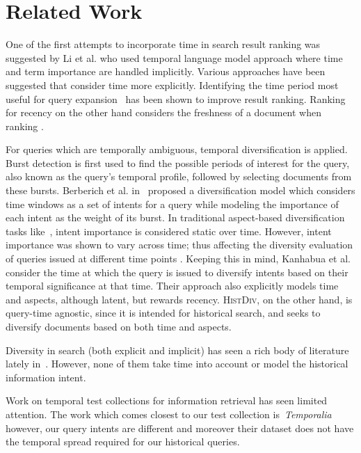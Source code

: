 \section{Related Work}
\vspace{-2mm}
One of the first attempts to incorporate time in search result ranking was suggested by Li et al. \cite{li2003time} who used temporal language model approach where time and term importance are handled implicitly. Various approaches have been suggested that consider time more explicitly. Identifying the time period most useful for query expansion~\cite{kanhabua2010determining,choi2012temporal} has been shown to improve result ranking. Ranking for recency on the other hand considers the freshness of a document when ranking \cite{dong2010towards}. 

For queries which are temporally ambiguous, temporal diversification is applied. Burst detection is first used to find the possible periods of interest for the query, also known as the query's temporal profile\cite{diaz2004using,peetz2012adaptive}, followed by selecting documents from these bursts. Berberich et al. in~\cite{lm+t+d} proposed a diversification model which considers time windows as a set of intents for a query while modeling the importance of each intent as the weight of its burst. In traditional aspect-based diversification tasks like~\cite{clarke2009overview,clarke2011nist}, intent importance is considered static over time. However, intent importance was shown to vary across time; thus affecting the diversity evaluation of queries issued at different time points \cite{zhou2013impact}. Keeping this in mind, Kanhabua et al.\cite{ecir/NguyenK14} consider the time at which the query is issued to diversify intents based on their temporal significance at that time. Their approach also explicitly models time and aspects, although latent, but rewards recency. \textsc{HistDiv}, on the other hand, is query-time agnostic, since it is intended for historical search, and seeks to diversify documents based on both time and aspects. 

Diversity in search (both explicit and implicit) has seen a rich body of literature lately in~\cite{dang_term_2013,carbonell1998use,agrawal_diversifying_2009,santos2010exploiting,Carterette:2009:PMR:1645953.1646116,zhu_learning_2014,liang_fusion_2014,dang_diversity_2012}. However, none of them take time into account or model the historical information intent.

Work on temporal test collections for information retrieval has seen limited attention. The work which comes closest to our test collection is~\emph{Temporalia}\cite{joho2014ntcir} however, our query intents are different and moreover their dataset does not have the temporal spread required for our historical queries.

